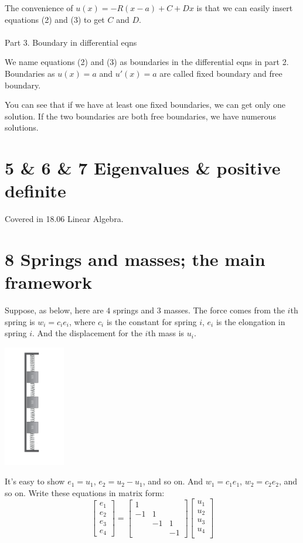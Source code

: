 \documentclass{article}
\newenvironment{nscenter}
{\parskip=0pt\par\nopagebreak\centering}
{\par\noindent\ignorespacesafterend}
\begin{document}
\begin{spacing}{1.5}
The convenience of $u(x) = -R(x-a) + C + Dx$ is that we can easily insert equations (2) and (3) to get $C$ and $D$.
\\\\Part 3. Boundary in differential eqns

We name equations (2) and (3) as boundaries in the differential eqns in part 2. Boundaries as $u(x)=a$ and $u'(x)=a$ are called fixed boundary and free boundary.

You can see that if we have at least one fixed boundaries, we can get only one solution. If the two boundaries are both free boundaries, we have numerous solutions.

\section*{5 \& 6 \& 7 Eigenvalues \& positive definite}
Covered in 18.06 Linear Algebra.


\section*{8 Springs and masses; the main framework}
Suppose, as below, here are $4$ springs and $3$ masses. The force comes from the $i$th spring is $w_i=c_ie_i$, where $c_i$ is the constant for spring $i$, $e_i$ is the elongation in spring $i$. And the displacement for the $i$th mass is $u_i$. 
\\\begin{nscenter}
	\includegraphics[width=0.2\textwidth]{four_springs_three_masses.png} \\ 
\end{nscenter}

It's easy to show $e_1 = u_1$, $e_2=u_2-u_1$, and so on. And $w_1 = c_1e_1$, $w_2=c_2e_2$, and so on. Write these equations in matrix form:
$$
\begin{bmatrix}
e_1 \\
e_2 \\
e_3 \\
e_4
\end{bmatrix}
=
\begin{bmatrix}
1  &   &  \\
-1 & 1 & \\
   & -1& 1\\
   &   & -1 
\end{bmatrix}
\begin{bmatrix}
u_1 \\
u_2 \\
u_3 \\
u_4 \\
\end{bmatrix}
$$


\end{spacing}
\end{document}
